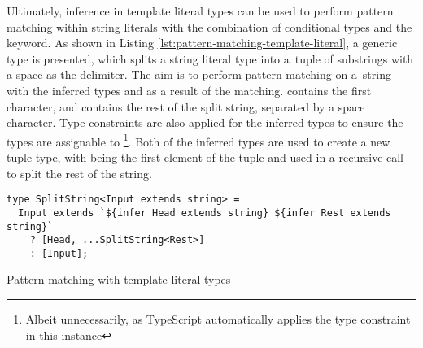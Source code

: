 \clearpage

Ultimately, inference in template literal types can be used to perform pattern matching within string literals with the combination of conditional types and the  keyword. As shown in Listing \ref{lst:pattern-matching-template-literal}, a generic type  is presented, which splits a string literal type into a~tuple of substrings with a space as the delimiter. The aim is to perform pattern matching on a~string with the inferred types  and  as a result of the matching.  contains the first character, and  contains the rest of the split string, separated by a space character. Type constraints are also applied for the inferred types to ensure the types are assignable to \footnote{Albeit unnecessarily, as TypeScript automatically applies the  type constraint in this instance}. Both of the inferred types are used to create a new tuple type, with  being the first element of the tuple and  used in a recursive call to split the rest of the string.

\begin{listing}[ht]
  \begin{verbatim}
type SplitString<Input extends string> = 
  Input extends `${infer Head extends string} ${infer Rest extends string}`
    ? [Head, ...SplitString<Rest>]
    : [Input];
\end{verbatim}
  \caption{Pattern matching with template literal types}\label{lst:pattern-matching-template-literal}
\end{listing}
